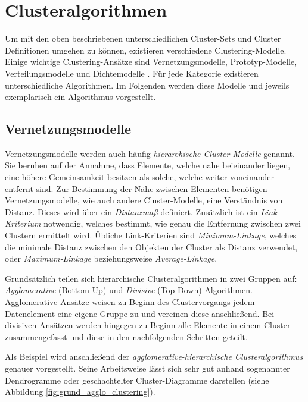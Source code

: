 \section{Clusteralgorithmen}
\label{sec:cluster_algos}

Um mit den oben beschriebenen unterschiedlichen Cluster-Sets und Cluster Definitionen umgehen zu können,
existieren verschiedene Clustering-Modelle.
Einige wichtige Clustering-Ansätze sind Vernetzungsmodelle, Prototyp-Modelle, Verteilungsmodelle
und Dichtemodelle \cite[]{tan2007introduction, SauravKaushik2016}. Für jede Kategorie existieren unterschiedliche Algorithmen. Im Folgenden werden
diese Modelle und jeweils exemplarisch ein Algorithmus vorgestellt.

\subsection{Vernetzungsmodelle}
\label{sec:grund_vernetzungs_clustering}

Vernetzungsmodelle werden auch häufig \textit{hierarchische Cluster-Modelle} genannt. Sie beruhen auf
der Annahme, dass Elemente, welche nahe beieinander liegen, eine höhere Gemeinsamkeit besitzen als solche,
welche weiter voneinander entfernt sind. Zur Bestimmung der Nähe zwischen Elementen benötigen Vernetzungsmodelle,
wie auch andere Cluster-Modelle, eine Verständnis von Distanz. Dieses wird über ein \textit{Distanzmaß} definiert.
Zusätzlich ist ein \textit{Link-Kriterium} notwendig,
welches bestimmt, wie genau die Entfernung zwischen zwei Clustern ermittelt wird. Übliche Link-Kriterien
sind \textit{Minimum-Linkage}, welches die minimale Distanz zwischen den Objekten der Cluster als Distanz verwendet,
oder \textit{Maximum-Linkage} beziehungsweise \textit{Average-Linkage}. \cite[]{Jain1999, GeorgeSeif2018}

Grundsätzlich teilen sich hierarchische Clusteralgorithmen in zwei Gruppen auf:
\textit{Agglomerative} (Bottom-Up) und \textit{Divisive} (Top-Down) Algorithmen.
Agglomerative Ansätze weisen zu Beginn des Clustervorgangs jedem Datenelement eine eigene Gruppe zu
und vereinen diese anschließend.
Bei divisiven Ansätzen werden hingegen zu Beginn alle Elemente in einem Cluster zusammengefasst und
diese in den nachfolgenden Schritten geteilt. \cite[]{SauravKaushik2016}

Als Beispiel wird anschließend der \textit{agglomerative-hierarchische Clusteralgorithmus} genauer vorgestellt.
Seine Arbeitsweise lässt sich sehr gut anhand sogenannter Dendrogramme oder geschachtelter Cluster-Diagramme darstellen
(siehe Abbildung \ref{fig:grund_agglo_clustering}).

